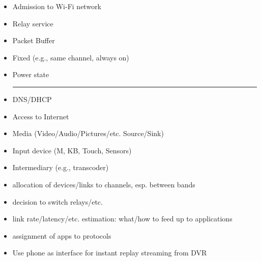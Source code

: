 \begin{itemize}
\item Admission to Wi-Fi network
\item Relay service
\item Packet Buffer
\item Fixed (e.g., same channel, always on)
\item Power state\\
\hrule
\item DNS/DHCP
\item Access to Internet
\item Media (Video/Audio/Pictures/etc. Source/Sink)
\item Input device (M, KB, Touch, Sensors)
\item Intermediary (e.g., transcoder)
\end{itemize}

\begin{itemize}
\item allocation of devices/links to channels, esp. between bands
\item decision to switch relays/etc.
\item link rate/latency/etc. estimation: what/how to feed up to applications
\item assignment of apps to protocols
\end{itemize}

\begin{itemize}
\item Use phone as interface for instant replay streaming from DVR
\end{itemize}
\fi